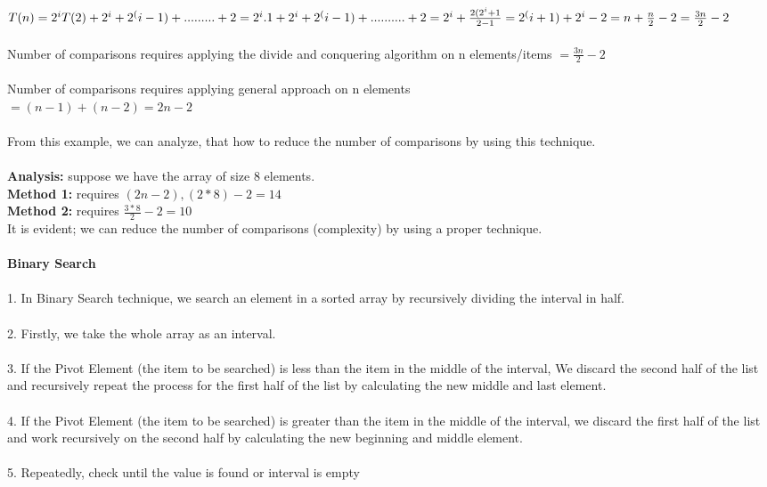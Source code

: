\documentclass{article}
\begin{document}
$T(n)=2^iT(2)+2^i+2^(i-1)+.........+2\\
           =2^i.1+2^i+2^(i-1)+..........+2 \\=2^i+\frac{2(2^i+1}{2-1}\\
=2^(i+1)+2^i-2\\
           =n+\frac{n}{2}-2\\
           =\frac{3n}{2}-2$\\
           \\
Number of comparisons requires applying the divide and conquering algorithm on n elements/items $=\frac{3n}{2}-2$\\
\\
Number of comparisons requires applying general approach on n elements \\$=(n-1)+(n-2)=2n-2$\\
 \\
 From this example, we can analyze, that how to reduce the number of comparisons by using this technique.\\
 \\
 \textbf{Analysis:} suppose we have the array of size 8 elements.\\
 \textbf{Method 1:} requires $(2n-2),(2*8)-2=14$\\
 \textbf{Method 2:} requires $\frac{3*8}{2}-2=10$\\
 
 It is evident; we can reduce the number of comparisons (complexity) by using a proper technique.\\
 \\
 \newpage
 \textbf{\huge Binary Search}\\
 \\
 1. In Binary Search technique, we search an element in a sorted array by recursively dividing the interval in half.\\
 \\
 2.  Firstly, we take the whole array as an interval.\\
 \\
 3.  If the Pivot Element (the item to be searched) is less than the item in the middle of the interval, We discard the second half of the list and recursively repeat the process for the first half of the list by calculating the new middle and last element.\\
\\
4. If the Pivot Element (the item to be searched) is greater than the item in the middle of the interval, we discard the first half of the list and work recursively on the second half by calculating the new beginning and middle element.\\
\\
5.  Repeatedly, check until the value is found or interval is empty\\
\\
\end{document}
